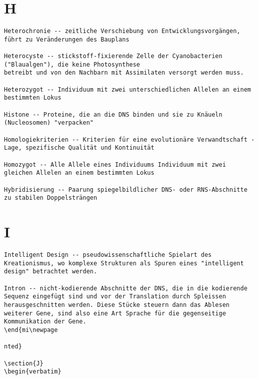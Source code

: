 \documentclass{article}
\begin{document}
\section{H}
\begin{verbatim}
Heterochronie -- zeitliche Verschiebung von Entwicklungsvorgängen, führt zu Veränderungen des Bauplans

Heterocyste -- stickstoff-fixierende Zelle der Cyanobacterien ("Blaualgen"), die keine Photosynthese
betreibt und von den Nachbarn mit Assimilaten versorgt werden muss.

Heterozygot -- Individuum mit zwei unterschiedlichen Allelen an einem bestimmten Lokus

Histone -- Proteine, die an die DNS binden und sie zu Knäueln (Nucleosomen) "verpacken"

Homologiekriterien -- Kriterien für eine evolutionäre Verwandtschaft - Lage, spezifische Qualität und Kontinuität

Homozygot -- Alle Allele eines Individuums Individuum mit zwei gleichen Allelen an einem bestimmten Lokus

Hybridisierung -- Paarung spiegelbildlicher DNS- oder RNS-Abschnitte zu stabilen Doppelsträngen
\end{verbatim}
\newpage


\section{I}
\begin{verbatim}
Intelligent Design -- pseudowissenschaftliche Spielart des Kreationismus, wo komplexe Strukturen als Spuren eines "intelligent design" betrachtet werden.

Intron -- nicht-kodierende Abschnitte der DNS, die in die kodierende Sequenz eingefügt sind und vor der Translation durch Spleissen herausgeschnitten werden. Diese Stücke steuern dann das Ablesen weiterer Gene, sind also eine Art Sprache für die gegenseitige Kommunikation der Gene.
\end{mi\newpage

nted}

\section{J}
\begin{verbatim}

\end{verbatim}
\newpage
\end{document}
